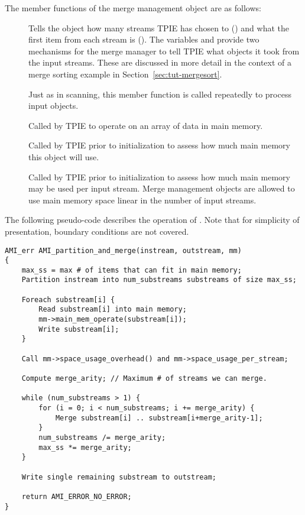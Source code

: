The member functions of the merge management object
 are as follows:

\begin{description}
    \item[] Tells the object how many
    streams TPIE has chosen to () and what the
    first item from each stream is (). The
    variables  and
     provide two mechanisms for the
    merge manager to tell TPIE what objects it took from the
    input streams. These are discussed in more detail in the
    context of a merge sorting example in
    Section~\ref{sec:tut-mergesort}.
    \item[] Just as in scanning, this
    member function is called repeatedly to process input
    objects.
    \item[] Called by TPIE to
    operate on an array of data in main memory.
    \item[] Called by TPIE
    prior to initialization to assess how much main memory
    this object will use.
    \item[] Called by TPIE
    prior to initialization to assess how much main memory
    may be used per input stream. Merge management objects
    are allowed to use main memory space linear in the
    number of input streams.
\end{description}

The following pseudo-code describes the operation of
.  Note that for
simplicity of presentation, boundary conditions are not
covered.

\begin{verbatim}
AMI_err AMI_partition_and_merge(instream, outstream, mm)
{
    max_ss = max # of items that can fit in main memory;
    Partition instream into num_substreams substreams of size max_ss;

    Foreach substream[i] {
        Read substream[i] into main memory;
        mm->main_mem_operate(substream[i]);
        Write substream[i];
    }

    Call mm->space_usage_overhead() and mm->space_usage_per_stream;
    
    Compute merge_arity; // Maximum # of streams we can merge.     

    while (num_substreams > 1) {
        for (i = 0; i < num_substreams; i += merge_arity) {
            Merge substream[i] .. substream[i+merge_arity-1];
        }
        num_substreams /= merge_arity;
        max_ss *= merge_arity;
    }

    Write single remaining substream to outstream;
        
    return AMI_ERROR_NO_ERROR;
}
\end{verbatim}


